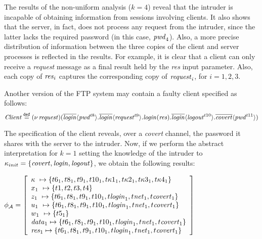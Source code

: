 \documentclass[10pt,a4paper,final,oneside,fleqn]{book}
\newcommand*{\eqdef}{\mathbin{\mathop{=}\limits^{\texttt{def}}}}
\begin{document}
\noindent
The results of the non-uniform analysis ($k=4$) reveal that the intruder is incapable of obtaining information from sessions involving clients.  It also shows that the server, in fact, does not process any request from the intruder, since the latter lacks the required password (in this case, $\mbox{{\itshape pwd\/}}_4$).
Also, a more precise distribution of information between the three copies of the client and server processes is reflected in the results.  For example, it is clear that a client can only receive a {\itshape request\/} message as a final result held by the {\itshape res\/} input parameter. Also, each copy of $\mbox{{\itshape res\/}}_i$ captures the corresponding copy of $\mbox{{\itshape request\/}}_i$, for $i=1,2,3$.

Another version of the FTP system may contain a faulty client specified as follows:
\[\mbox{{\itshape Client\/}}\eqdef(\nu~\!\mbox{{\itshape request\/}})(\overline{\mbox{{\itshape login\/}}}\langle\mbox{{\itshape pwd\/}}^{t8}\rangle.\overline{\mbox{{\itshape login\/}}}\langle\mbox{{\itshape request\/}}^{t9}\rangle.\mbox{{\itshape login\/}}(\mbox{{\itshape res\/}}).\overline{\mbox{{\itshape login\/}}}\langle\mbox{{\itshape logout\/}}^{t10}\rangle.\overline{\mbox{{\itshape covert\/}}}\langle\mbox{{\itshape pwd\/}}^{t11}\rangle)\]

\noindent
The specification of the client reveals, over a {\itshape covert\/} channel, the password it shares with the server to the intruder.  Now, if we perform the abstract interpretation for $k=1$ setting the knowledge of the intruder to $\kappa_{init}=\{\mbox{{\itshape covert\/}},\mbox{{\itshape login\/}},\mbox{{\itshape logout\/}}\}$, we obtain the following results:\vspace{6mm}

\noindent
$\phi_\mathcal{A}=\left[\begin{array}{l}
\kappa~\mapsto\{t6_1, t8_1, t9_1, t10_1, t\kappa 1_1, t\kappa 2_1, t\kappa 3_1, t\kappa 4_1\}\\
x_1~\mapsto\{t1, t2, t3, t4\}\\
z_1~\mapsto\{t6_1, t8_1, t9_1, t10_1, t\mbox{{\itshape login\/}}_1, t\mbox{{\itshape net\/}}_1, t\mbox{{\itshape covert\/}}_1\}\\
u_1~\mapsto\{t6_1, t8_1, t9_1, t10_1, t\mbox{{\itshape login\/}}_1, t\mbox{{\itshape net\/}}_1, t\mbox{{\itshape covert\/}}_1\}\\
w_1~\mapsto\{t5_1\}\\
\mbox{{\itshape data\/}}_1\mapsto\{t6_1, t8_1, t9_1, t10_1, t\mbox{{\itshape login\/}}_1, t\mbox{{\itshape net\/}}_1, t\mbox{{\itshape covert\/}}_1\}\\
\mbox{{\itshape res\/}}_1\mapsto\{t6_1, t8_1, t9_1, t10_1, t\mbox{{\itshape login\/}}_1, t\mbox{{\itshape net\/}}_1, t\mbox{{\itshape covert\/}}_1\}
\end{array}\right]$\vspace{6mm}
\end{document}
